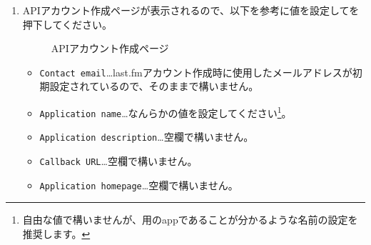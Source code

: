 \begin{enumerate}
            \newpage
            \item APIアカウント作成ページが表示されるので、以下を参考に値を設定してを押下してください。
                \begin{figure}[htbp]
                    \centering
                    \caption{APIアカウント作成ページ}
                    \label{img:lastfm3}
                \end{figure}
                \begin{itemize}
                    \item \texttt{Contact email}…last.fmアカウント作成時に使用したメールアドレスが初期設定されているので、そのままで構いません。
                    \item \texttt{Application name}…なんらかの値を設定してください\footnote{自由な値で構いませんが、\bj 用のappであることが分かるような名前の設定を推奨します。}。
                    \item \texttt{Application description}…空欄で構いません。
                    \item \texttt{Callback URL}…空欄で構いません。
                    \item \texttt{Application homepage}…空欄で構いません。
                \end{itemize}


\end{enumerate}
